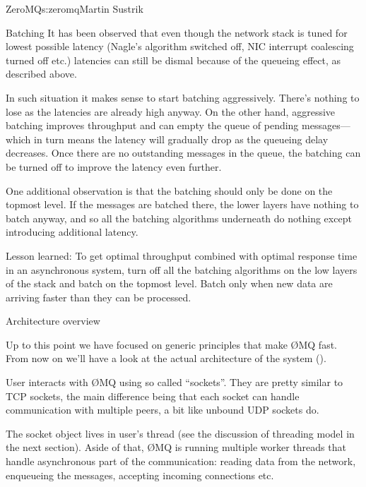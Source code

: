 \begin{aosachapter}{ZeroMQ}{s:zeromq}{Martin Sustrik}
\begin{aosasect1}{Batching}
It has been observed that even though the network stack is tuned for
lowest possible latency (Nagle's algorithm switched off, NIC interrupt
coalescing turned off etc.) latencies can still be dismal because of
the queueing effect, as described above.

In such situation it makes sense to start batching
aggressively. There's nothing to lose as the latencies are already
high anyway. On the other hand, aggressive batching improves
throughput and can empty the queue of pending messages---which in
turn means the latency will gradually drop as the queueing delay
decreases. Once there are no outstanding messages in the queue, the
batching can be turned off to improve the latency even further.

One additional observation is that the batching should only be done on
the topmost level. If the messages are batched there, the lower layers
have nothing to batch anyway, and so all the batching algorithms
underneath do nothing except introducing additional latency.

Lesson learned: To get optimal throughput combined with optimal
response time in an asynchronous system, turn off all the batching
algorithms on the low layers of the stack and batch on the topmost
level. Batch only when new data are arriving faster than they can be
processed.

\end{aosasect1}

\begin{aosasect1}{Architecture overview}

Up to this point we have focused on generic principles that make {\O}MQ
fast. From now on we'll have a look at the actual architecture of the
system ().


User interacts with {\O}MQ using so called ``sockets''. They are pretty
similar to TCP sockets, the main difference being that each socket can
handle communication with multiple peers, a bit like unbound UDP
sockets do.

The socket object lives in user's thread (see the discussion of
threading model in the next section). Aside of that, {\O}MQ is running
multiple worker threads that handle asynchronous part of the
communication: reading data from the network, enqueueing the messages,
accepting incoming connections etc.


\end{aosasect1}
\end{aosachapter}

